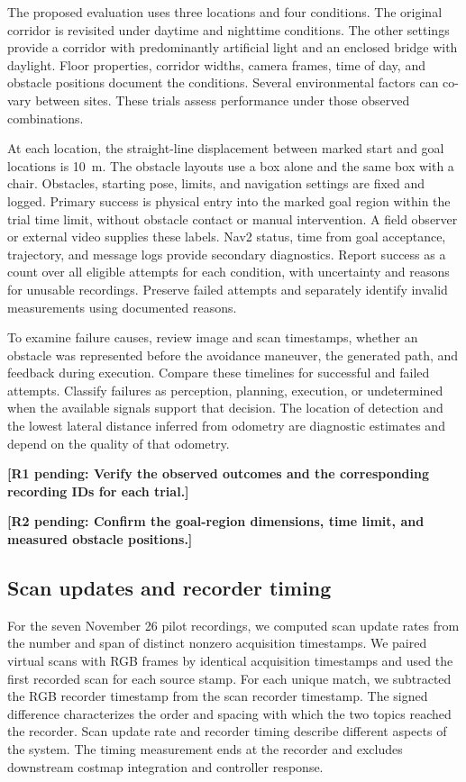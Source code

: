 \documentclass[pdflatex,sn-mathphys-num]{sn-jnl}
\newif\ifdraftreview
\newcommand{\reviewbadge}[1]{%
  \colorbox{reviewfill}{\textcolor{reviewink}{\sffamily\bfseries\strut #1}}}
\newcommand{\pending}[2]{%
  \ifdraftreview
    \hyperlink{author-checklist}{\reviewbadge{#1}}\nobreak\space
    \textcolor{reviewink}{\textbf{[Pending: #2]}}%
  \else
    \textbf{[#1 pending: #2]}%
  \fi}
\begin{document}
The proposed evaluation uses three locations and four conditions. The original corridor is revisited under daytime and nighttime conditions. The other settings provide a corridor with predominantly artificial light and an enclosed bridge with daylight. Floor properties, corridor widths, camera frames, time of day, and obstacle positions document the conditions. Several environmental factors can co-vary between sites. These trials assess performance under those observed combinations.

At each location, the straight-line displacement between marked start and goal locations is 10~m. The obstacle layouts use a box alone and the same box with a chair. Obstacles, starting pose, limits, and navigation settings are fixed and logged. Primary success is physical entry into the marked goal region within the trial time limit, without obstacle contact or manual intervention. A field observer or external video supplies these labels. Nav2 status, time from goal acceptance, trajectory, and message logs provide secondary diagnostics. Report success as a count over all eligible attempts for each condition, with uncertainty and reasons for unusable recordings. Preserve failed attempts and separately identify invalid measurements using documented reasons.

To examine failure causes, review image and scan timestamps, whether an obstacle was represented before the avoidance maneuver, the generated path, and feedback during execution. Compare these timelines for successful and failed attempts. Classify failures as perception, planning, execution, or undetermined when the available signals support that decision. The location of detection and the lowest lateral distance inferred from odometry are diagnostic estimates and depend on the quality of that odometry.

\pending{R1}{Verify the observed outcomes and the corresponding recording IDs for each trial.}
\pending{R2}{Confirm the goal-region dimensions, time limit, and measured obstacle positions.}

\subsection{Scan updates and recorder timing}

For the seven November 26 pilot recordings, we computed scan update rates from the number and span of distinct nonzero acquisition timestamps. We paired virtual scans with RGB frames by identical acquisition timestamps and used the first recorded scan for each source stamp. For each unique match, we subtracted the RGB recorder timestamp from the scan recorder timestamp. The signed difference characterizes the order and spacing with which the two topics reached the recorder. Scan update rate and recorder timing describe different aspects of the system. The timing measurement ends at the recorder and excludes downstream costmap integration and controller response.
\end{document}
